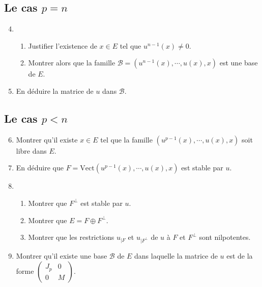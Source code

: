 \documentclass[a4paper,11pt]{article}
\begin{document}
	\subsection{Le cas $p=n$}
	\begin{enumerate}
	\setcounter{enumi}{3}
	\item \begin{enumerate}
	\item Justifier l'existence de $x\in E$ tel que $u^{n-1}(x)\neq 0$.
	\item Montrer alors que la famille $\mathcal{B}=(u^{n-1}(x),\cdots,u(x),x)$ est une base de $E$.
	\end{enumerate}
	\item En déduire la matrice de $u$ dans $\mathcal{B}$.
	\end{enumerate}
	\subsection{Le cas $p<n$}
	\begin{enumerate}
	\setcounter{enumi}{5}
	\item Montrer qu'il existe $x\in E$ tel que la famille $(u^{p-1}(x),\cdots,u(x),x)$ soit libre dans $E$.
	\item En déduire que $F=\mathrm{Vect}\left(u^{p-1}(x),\cdots,u(x),x\right)$ est stable par $u$.
	\item \begin{enumerate}
	\item Montrer que $F^\perp$ est stable par $u$.
	\item Montrer que $E=F\oplus F^\perp$.
	\item Montrer que les restrictions $u_{\vert F}$ et $u_{\vert F^\perp}$ de $u$ à $F$ et $F^\perp$ sont nilpotentes.
	\end{enumerate}
	\item Montrer qu'il existe une base $\mathcal{B}$ de $E$ dans laquelle la matrice de $u$ est de la forme $\begin{pmatrix}
	J_p&0\\0&M
	\end{pmatrix}$.
	\end{enumerate}
	
\end{document}
